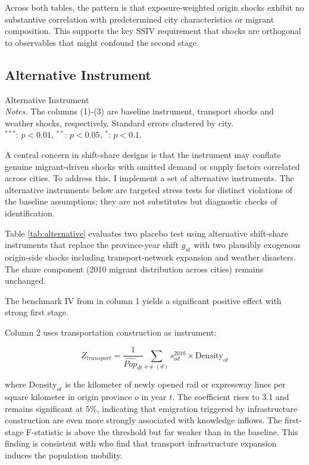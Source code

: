 \documentclass[12pt]{article}
\begin{document}
Across both tables, the pattern is that exposure-weighted origin shocks exhibit no substantive correlation with predetermined city characteristics or migrant composition. This supports the key SSIV requirement that shocks are orthogonal to observables that might confound the second stage.

\subsection{Alternative Instrument}

\begin{table}[htbp!]
  \centering 
  \resizebox{\textwidth}{!}{
  }
  \caption{Alternative Instrument \vspace{1ex} \\ 
  {\footnotesize \emph{Notes.} The columns (1)-(3) are baseline instrument, transport shocks and weather shocks, respectively. Standard errors clustered by city.
 \\ $^{***}$: $p < 0.01$, $^{**}$: $p < 0.05$, $^{*}$: $p < 0.1$.}}
 \label{tab:alternative}
\end{table}

A central concern in shift-share designs is that the instrument may conflate genuine migrant-driven shocks with omitted demand or supply factors correlated across cities. To address this, I implement a set of alternative instruments. The alternative instruments below are targeted stress tests for distinct violations of the baseline assumptions; they are not substitutes but diagnostic checks of identification.

Table \ref{tab:alternative} evaluates two placebo test using alternative shift-share instruments that replace the province-year shift $g_{ot}$ with two plausibly exogenous origin-side shocks including transport-network expansion and weather disasters. The share component (2010 migrant distribution across cities) remains unchanged.

The benchmark IV from in column 1 yields a significant positive effect with strong first stage.

Column 2 uses transportation construction as instrument: 

\begin{equation*}
  Z_{transport}= \frac{1}{\hat{Pop}_{dt}}\sum_{o \neq \text{}(d)}  s_{od}^{2010}\times \text{Density}_{ot}
\end{equation*}

where $\text{Density}_{ot}$ is the kilometer of newly opened rail or expressway lines per square kilometer in origin province $o$ in year $t$. The coefficient rises to 3.1 and remains significant at 5\%, indicating that emigration triggered by infrastructure construction are even more strongly associated with knowledge inflows. The first-stage F-statistic is above the threshold but far weaker than in the baseline. This finding is consistent with \cite{douPainGainEffects2024} who find that transport infrastructure expansion induces the population mobility. 
\end{document}
